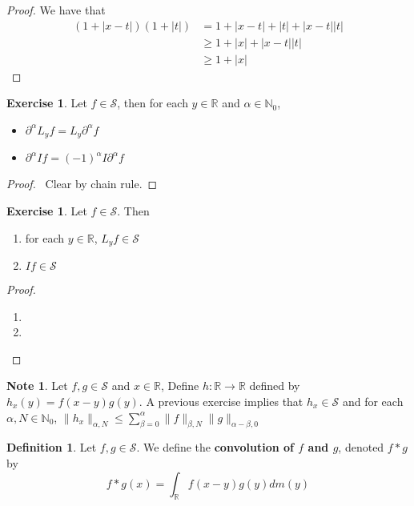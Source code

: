 \documentclass[12pt]{amsart}
\theoremstyle{definition}
\newtheorem{defn}[definition]{Definition}
\newtheorem{note}[definition]{Note}
\newtheorem{ex}[definition]{Exercise}
\newcommand{\p}{\partial}
\newcommand{\al}{\alpha}
\newcommand{\bet}{\beta}
\newcommand{\N}{\mathbb{N}}
\newcommand{\R}{\mathbb{R}}
\newcommand{\MS}{\mathcal{S}}
\begin{document}
	\begin{proof}
		We have that 
		\begin{align*}
			(1+ |x-t|)(1 + |t|) 
			& = 1 + |x-t| + |t| + |x-t||t| \\
			& \geq 1 + |x| + |x-t||t| \\
			& \geq 1 + |x| 
		\end{align*}
	\end{proof}

	\begin{ex}
		Let $f \in \MS$, then for each $y \in \R$ and $\al \in \N_0$, 
		\begin{itemize}
			\item $\p^{\al}L_yf = L_y \p^{\al}f$
			\item $\p^{\al}If = (-1)^{\al} I \p^{\al}f$
		\end{itemize}
	\end{ex}

	\begin{proof}\
		Clear by chain rule.
	\end{proof}

	\begin{ex}
		Let $f \in \MS$. Then 
		\begin{enumerate}
			\item for each $y \in \R$, $L_y f \in \MS$ 
			\item $If \in \MS$
		\end{enumerate}
	\end{ex}

	\begin{proof}\
		\begin{enumerate}
			\item  
			\item 
		\end{enumerate}
	\end{proof}

	\begin{note}
		 Let $f,g \in \MS$ and $x \in \R$, Define $h: \R \rightarrow \R$ defined by $h_x(y) = f(x-y)g(y)$. A previous exercise implies that $h_x \in \MS$ and for each $\al, N \in \N_0$, $\|h_x\|_{\al, N} \leq \sum_{\bet=0}^{\al} \|f\|_{\bet, N} \|g\|_{\al - \bet, 0} $
	\end{note}

	\begin{defn}
		Let $f, g \in \MS$. We define the \textbf{convolution of $f$ and $g$}, denoted $f * g$ by $$f*g(x) = \int_{\R} f(x-y)g(y) dm(y)$$
	\end{defn}
\end{document}
